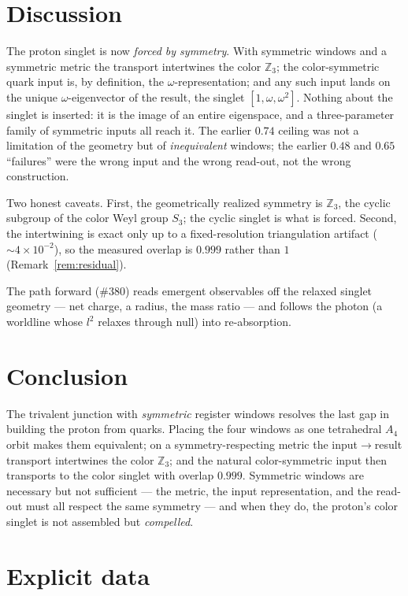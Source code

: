 \documentclass[11pt]{article}
\theoremstyle{definition}
\newcommand{\Z}{\mathbb{Z}}
\begin{document}
\section{Discussion}
\label{sec:discussion}

The proton singlet is now \emph{forced by symmetry}. With symmetric windows and a
symmetric metric the transport intertwines the color $\Z_3$; the color-symmetric quark
input is, by definition, the $\omega$-representation; and any such input lands on the
unique $\omega$-eigenvector of the result, the singlet $[1,\omega,\omega^2]$. Nothing
about the singlet is inserted: it is the image of an entire eigenspace, and a
three-parameter family of symmetric inputs all reach it. The earlier $0.74$ ceiling was
not a limitation of the geometry but of \emph{inequivalent} windows; the earlier $0.48$
and $0.65$ ``failures'' were the wrong input and the wrong read-out, not the wrong
construction.

Two honest caveats. First, the geometrically realized symmetry is $\Z_3$, the cyclic
subgroup of the color Weyl group $S_3$; the cyclic singlet is what is forced. Second,
the intertwining is exact only up to a fixed-resolution triangulation artifact
($\sim4\times10^{-2}$), so the measured overlap is $0.999$ rather than $1$
(Remark~\ref{rem:residual}).

The path forward (\#380) reads emergent observables off the relaxed singlet geometry
--- net charge, a radius, the mass ratio --- and follows the photon (a worldline whose
$l^2$ relaxes through null) into re-absorption.

\section{Conclusion}
The trivalent junction with \emph{symmetric} register windows resolves the last gap in
building the proton from quarks. Placing the four windows as one tetrahedral $A_4$ orbit
makes them equivalent; on a symmetry-respecting metric the input$\to$result transport
intertwines the color $\Z_3$; and the natural color-symmetric input then transports to
the color singlet with overlap $0.999$. Symmetric windows are necessary but not
sufficient --- the metric, the input representation, and the read-out must all respect
the same symmetry --- and when they do, the proton's color singlet is not assembled but
\emph{compelled}.

\appendix
\section{Explicit data}
\label{app:data}
\end{document}
